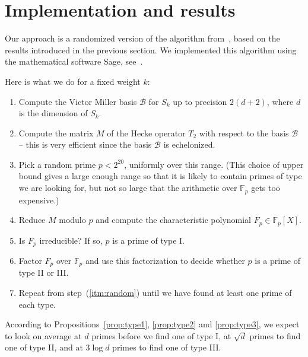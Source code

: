 \documentclass[11pt]{article}
\theoremstyle{plain}
\theoremstyle{definition}
\theoremstyle{remark}
\numberwithin{equation}{section}
\newcommand{\FF}{\mathbb{F}}
\newcommand{\cB}{\mathcal{B}}
\begin{document}
\section{Implementation and results}
\label{sect:implementation}
Our approach is a randomized version of the algorithm
from~\cite{ConreyFarmer}, based on the results introduced in the previous
section.  We implemented this algorithm using the mathematical software Sage, 
see~\cite{Sage}.

Here is what we do for a fixed weight $k$:
\begin{enumerate}
  \item\label{itm:vmbasis} Compute the Victor Miller basis $\cB$ for $S_k$ up to precision
    $2(d+2)$, where $d$ is the dimension of $S_k$.
  \item\label{itm:hecke} Compute the matrix $M$ of the Hecke operator $T_2$ with respect to the
    basis $\cB$ -- this is very efficient since the basis $\cB$ is
    echelonized.
  \item\label{itm:random} Pick a random prime $p<2^{20}$, uniformly over this
    range.  (This choice of upper
    bound gives a large enough range so that it is likely to contain primes of
    type we are looking for, but not so large that the arithmetic over $\FF_p$
    gets too expensive.)
  \item Reduce $M$ modulo $p$ and compute the characteristic polynomial
    $F_p\in \FF_p[X]$.
  \item Is $F_p$ irreducible?  If so, $p$ is a prime of type I.
  \item Factor $F_p$ over $\FF_p$ and use this factorization to decide whether
    $p$ is a prime of type II or III.
  \item Repeat from step~(\ref{itm:random}) until we have found at
    least one prime of each type.
\end{enumerate}

According to Propositions~\ref{prop:type1}, \ref{prop:type2} and
\ref{prop:type3}, we expect to look on average at $d$ primes before we find
one of type I, at $\sqrt{d}$ primes to find one of type II, and at $3\log d$
primes to find one of type III.
\end{document}
